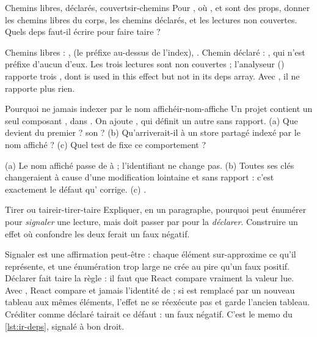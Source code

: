 \begin{exercice}{Chemins libres, déclarés, couverts}{ir-chemins}
Pour , où ,  et  sont des props, donner les chemins libres du corps, les chemins déclarés, et les lectures non couvertes. Quels deps faut-il écrire pour faire taire  ?
\end{exercice}
\begin{solution}
Chemins libres : ,  (le préfixe au-dessus de l'index), . Chemin déclaré : , qui n'est préfixe d'aucun d'eux. Les trois lectures sont non couvertes ; l'analyseur () rapporte trois \Warning{} , dont \og {} is used in this effect but not in its deps array\fg{}. Avec \code{[x.a, i, f]}, il ne rapporte plus rien.
\end{solution}

\begin{exercice}{Pourquoi ne jamais indexer par le nom affiché}{ir-nom-affiche}
Un projet contient un seul composant , dans . On ajoute , qui définit un autre  sans rapport. (a) Que devient  du premier ? son  ? (b) Qu'arriverait-il à un store partagé indexé par le nom affiché ? (c) Quel test de  fixe ce comportement ?
\end{exercice}
\begin{solution}
(a) Le nom affiché passe de  à  ; l'identifiant ne change pas. (b) Toutes ses clés changeraient à cause d'une modification lointaine et sans rapport : c'est exactement le défaut qu' corrige. (c) .
\end{solution}

\begin{exercice}{Tirer ou taire}{ir-tirer-taire}
Expliquer, en un paragraphe, pourquoi  peut énumérer  pour \emph{signaler} une lecture, mais doit passer par  pour la \emph{déclarer}. Construire un effet où confondre les deux ferait un faux négatif.
\end{exercice}
\begin{solution}
Signaler est une affirmation \og peut-être\fg{} : chaque élément sur-approxime ce qu'il représente, et une énumération trop large ne crée au pire qu'un faux positif. Déclarer fait taire la règle : il faut que React compare vraiment la valeur lue. Avec , React compare  et jamais l'identité de  ; si  est remplacé par un nouveau tableau aux mêmes éléments, l'effet ne se réexécute pas et  garde l'ancien tableau. Créditer  comme déclaré tairait ce défaut : un faux négatif. C'est le memo du \cref{lst:ir-deps}, signalé à bon droit.
\end{solution}
